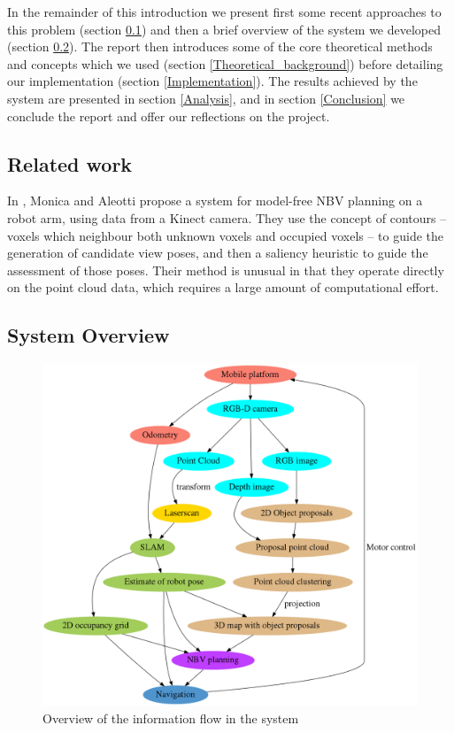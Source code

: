 In the remainder of this introduction we present first some recent approaches to this problem (section \ref{sub:related_work}) and then a brief overview of the system we developed (section \ref{sub:system_overview}).
The report then introduces some of the core theoretical methods and concepts which we used (section \ref{Theoretical_background}) before detailing our implementation (section \ref{Implementation}).
The results achieved by the system are presented in section \ref{Analysis}, and in section \ref{Conclusion} we conclude the report and offer our reflections on the project.

\subsection{Related work}
\label{sub:related_work}

In \cite{monica2017}, Monica and Aleotti propose a system for model-free NBV planning on a robot arm, using data from a Kinect camera.
They use the concept of contours -- voxels which neighbour both unknown voxels and occupied voxels -- to guide the generation of candidate view poses, and then a saliency heuristic to guide the assessment of those poses.
Their method is unusual in that they operate directly on the point cloud data, which requires a large amount of computational effort.



\subsection{System Overview} %
\label{sub:system_overview}

\begin{figure}[ht]
	\begin{center}
		\includegraphics[width=0.85\linewidth]{dot/overview.png} 
		\caption{Overview of the information flow in the system}
		\label{fig:overview}
	\end{center}
\end{figure}

